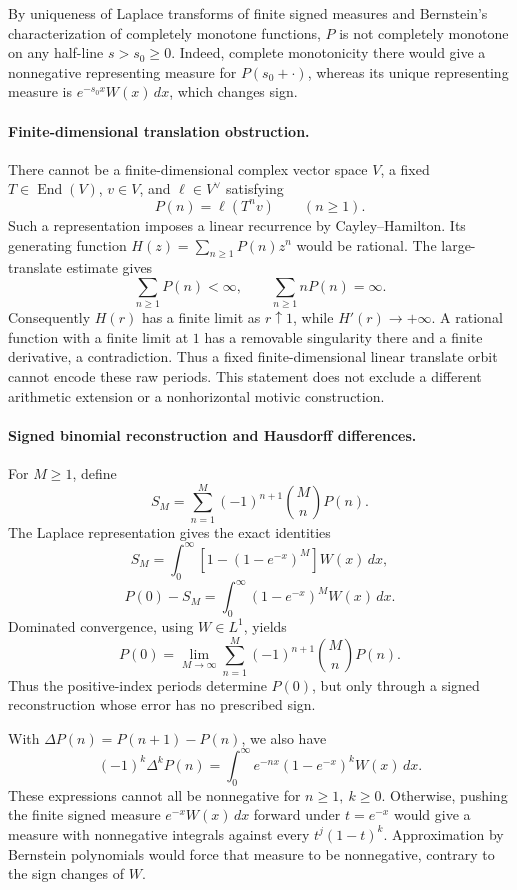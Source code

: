 \documentclass[11pt]{article}
\begin{document}
By uniqueness of Laplace transforms \cite{Widder} of finite signed
measures and Bernstein's characterization of completely
monotone functions, \(P\) is not completely monotone on
any half-line \(s>s_0\ge0\). Indeed, complete monotonicity
there would give a nonnegative representing measure for
\(P(s_0+\cdot)\), whereas its unique representing measure
is \(e^{-s_0x}W(x)\,dx\), which changes sign.

\paragraph{Finite-dimensional translation obstruction.}
There cannot be a finite-dimensional complex vector
space \(V\), a fixed \(T\in\operatorname{End}(V)\),
\(v\in V\), and \(\ell\in V^\vee\) satisfying
\[
 P(n)=\ell(T^nv)\qquad(n\ge1).
\]
Such a representation imposes a linear recurrence by Cayley--Hamilton.
Its generating function \(H(z)=\sum_{n\ge1}P(n)z^n\) would be rational.
The large-translate estimate gives
\[
 \sum_{n\ge1}P(n)<\infty,\qquad
 \sum_{n\ge1}nP(n)=\infty.
\]
Consequently \(H(r)\) has a finite limit as \(r\uparrow1\),
while \(H'(r)\to+\infty\). A rational function with a finite
limit at \(1\) has a removable singularity there and a
finite derivative, a contradiction. Thus a fixed
finite-dimensional linear translate orbit cannot encode
these raw periods. This statement does not exclude a
different arithmetic extension or a nonhorizontal
motivic construction.

\paragraph{Signed binomial reconstruction and Hausdorff
differences.}
For \(M\ge1\), define
\[
 S_M=\sum_{n=1}^M(-1)^{n+1}\binom MnP(n).
\]
The Laplace representation gives the exact identities
\[
 S_M=\int_0^\infty
       [1-(1-e^{-x})^M]W(x)\,dx,
\]
\[
 P(0)-S_M=
       \int_0^\infty(1-e^{-x})^M W(x)\,dx.
\]
Dominated convergence, using \(W\in L^1\), yields
\[
 \boxed{\displaystyle
 P(0)=\lim_{M\to\infty}
       \sum_{n=1}^M(-1)^{n+1}\binom MnP(n).}
\]
Thus the positive-index periods determine \(P(0)\),
but only through a signed reconstruction whose error
has no prescribed sign.

With \(\Delta P(n)=P(n+1)-P(n)\), we also have
\[
 (-1)^k\Delta^kP(n)=
 \int_0^\infty e^{-nx}(1-e^{-x})^kW(x)\,dx.
\]
These expressions cannot all be nonnegative for
\(n\ge1,\ k\ge0\). Otherwise, pushing the finite signed
measure \(e^{-x}W(x)\,dx\) forward under \(t=e^{-x}\)
would give a measure with nonnegative integrals against
every \(t^j(1-t)^k\). Approximation by Bernstein
polynomials would force that measure to be nonnegative,
contrary to the sign changes of \(W\).
\end{document}

